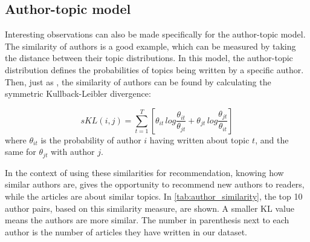 \subsection{Author-topic model}\label{sec:discussion_author_topic}
Interesting observations can also be made specifically for the author-topic model.
The similarity of authors is a good example, which can be measured by taking the distance between their topic distributions.
In this model, the author-topic distribution defines the probabilities of topics being written by a specific author.
Then, just as \citet{author_topic_2012}, the similarity of authors can be found by calculating the symmetric Kullback-Leibler divergence:

\begin{equation} \label{eq:author_similarity}
	sKL(i,j) = \sum_{t=1}^{T}\left[\theta_{it}\, log \frac{\theta_{it}}{\theta_{jt}} + \theta_{jt}\, log \frac{\theta_{jt}}{\theta_{it}}\right]
\end{equation}
\noindent where $\theta_{it}$ is the probability of author $i$ having written about topic $t$, and the same for $\theta_{jt}$ with author $j$.

In the context of using these similarities for recommendation, knowing how similar authors are, gives the opportunity to recommend new authors to readers, while the articles are about similar topics.
In \autoref{tab:author_similarity}, the top 10 author pairs, based on this similarity measure, are shown.
A smaller KL value means the authors are more similar.
The number in parenthesis next to each author is the number of articles they have written in our dataset.

